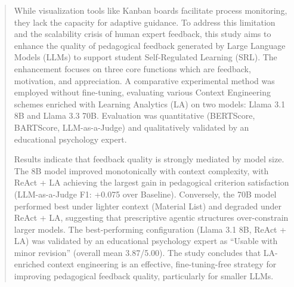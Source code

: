 \documentclass[conference,a4paper]{IEEEtran}
\begin{document}
\begin{abstract}

While visualization tools like Kanban boards facilitate process 
monitoring, they lack the capacity for adaptive guidance. To address 
this limitation and the scalability crisis of human expert feedback, 
this study aims to enhance the quality of pedagogical feedback generated 
by Large Language Models (LLMs) to support student Self-Regulated Learning 
(SRL). The enhancement focuses on three core functions which are feedback, 
motivation, and appreciation. A comparative experimental method was 
employed without fine-tuning, evaluating various Context Engineering 
schemes enriched with Learning Analytics (LA) on two models: Llama 3.1 8B 
and Llama 3.3 70B. Evaluation was quantitative (BERTScore, BARTScore, 
LLM-as-a-Judge) and qualitatively validated by an educational psychology
expert.


Results indicate that feedback quality is strongly mediated by model
size. The 8B model improved monotonically with context complexity,
with ReAct + LA achieving the largest gain in pedagogical criterion
satisfaction (LLM-as-a-Judge F1: +0.075 over Baseline). Conversely,
the 70B model performed best under lighter context (Material List) and
degraded under ReAct + LA, suggesting that prescriptive agentic
structures over-constrain larger models. The best-performing
configuration (Llama 3.1 8B, ReAct + LA) was validated by an
educational psychology expert as “Usable with minor revision”
(overall mean 3.87/5.00). The study concludes that LA-enriched
context engineering is an effective, fine-tuning-free strategy for
improving pedagogical feedback quality, particularly for smaller LLMs.


\end{abstract}
\end{document}
